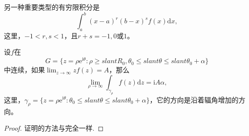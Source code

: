 \documentclass[../../main.tex]{subfiles}
\begin{document}
另一种重要类型的有穷限积分是
\[
\int_{a}^{b} (x - a)^r (b - x)^s f(x) \mathrm{d}x,
\]
这里，\( -1 < r, s < 1 \)，且\( r + s = -1, 0 \)或\( 1 \)。

\begin{lemma}\label{lemma:引理5.5.15}
设\( f \)在
\[
G = \{ z = \rho \mathrm{e}^{\mathrm{i}\theta} : \rho \geqslant slant R_0, \theta_0 \leqslant slant \theta \leqslant slant \theta_0 + \alpha \}
\]
中连续，如果\(\lim_{z \to \infty} z f(z) = A\)，那么
\[
\lim_{\rho \to \infty} \int_{\gamma_{\rho}} f(z) \mathrm{d}z = \mathrm{i}A\alpha,
\]
这里，\(\gamma_{\rho} = \{ z = \rho \mathrm{e}^{\mathrm{i}\theta} : \theta_0 \leqslant slant \theta \leqslant slant \theta_0 + \alpha \}\)，它的方向是沿着辐角增加的方向。
\end{lemma}
\begin{proof}
证明的方法与完全一样.
\end{proof}
\end{document}
